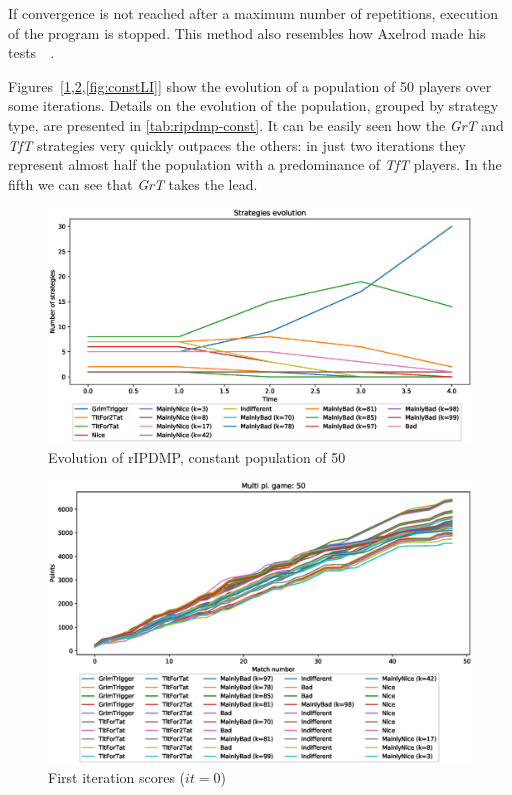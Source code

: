 \documentclass[journal,10pt,twoside]{IEEEtran}
\begin{document}
If convergence is not reached after a maximum number of repetitions, execution of the program is stopped.
This method also resembles how Axelrod made his tests~\cite[\S 2.6]{mathieu2017}~\cite{axelrod1984evolution}.

Figures~[\ref{fig:constR},\ref{fig:constFI},\ref{fig:constLI}] show the evolution of a population of 50 players over some iterations.
Details on the evolution of the population, grouped by strategy type, are presented in \autoref{tab:ripdmp-const}.
It can be easily seen how the \textit{GrT} and \textit{TfT} strategies very quickly outpaces the others: in just two iterations they represent almost half the population with a predominance of \textit{TfT} players. In the fifth we can see that \textit{GrT} takes the lead.

\begin{figure}[!ht]
    \centering
    \includegraphics[width=1\columnwidth]{../img/ripdmp-const/ripdmp-evolution-const-pop-50}
    \caption{Evolution of rIPDMP, constant population of 50}
    \label{fig:constR}
\end{figure}

\begin{figure}[!ht]
    \centering
    \includegraphics[width=1\columnwidth]{../img/ripdmp-const/ripdmp-scores-const-pop-50-r0}
    \caption{First iteration scores ($it=0$)}
    \label{fig:constFI}
\end{figure}
\end{document}

